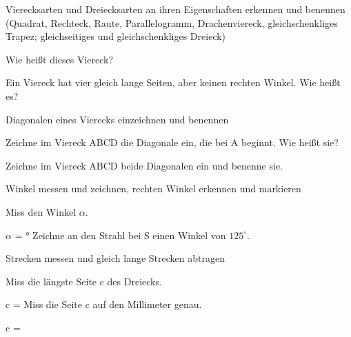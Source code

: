 \begin{aufgabe}{Vierecksarten und Dreiecksarten an ihren Eigenschaften erkennen und benennen (Quadrat, Rechteck, Raute, Parallelogramm, Drachenviereck, gleichschenkliges Trapez; gleichseitiges und gleichschenkliges Dreieck)}
\begin{teile}
\teil Wie heißt dieses Viereck?

\teil Ein Viereck hat vier gleich lange Seiten, aber keinen rechten Winkel. Wie heißt es?
\end{teile}
\end{aufgabe}

\begin{aufgabe}{Diagonalen eines Vierecks einzeichnen und benennen}
\begin{teile}
\teil Zeichne im Viereck ABCD die Diagonale ein, die bei A beginnt. Wie heißt sie?

\teil Zeichne im Viereck ABCD beide Diagonalen ein und benenne sie.

\end{teile}
\end{aufgabe}

\begin{aufgabe}{Winkel messen und zeichnen, rechten Winkel erkennen und markieren}
\begin{teile}
\teil Miss den Winkel $\alpha$.

$\alpha$ = \leerfeld °
\teil Zeichne an den Strahl bei S einen Winkel von $125^\circ$.

\winkelstrahl
\end{teile}
\end{aufgabe}

\begin{aufgabe}{Strecken messen und gleich lange Strecken abtragen}
\begin{teile}
\teil Miss die längste Seite c des Dreiecks.

c = \leerfeld[cm]
\teil Miss die Seite c auf den Millimeter genau.

c = \leerfeld[cm]
\end{teile}
\end{aufgabe}

